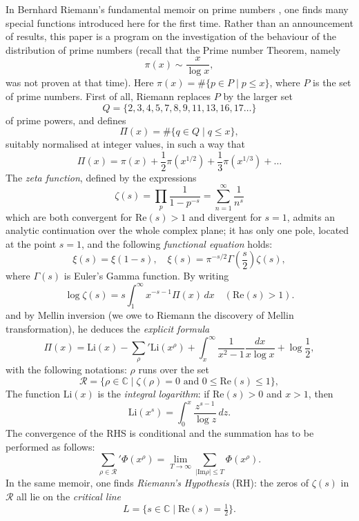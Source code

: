 \documentclass[12pt]{article}
\begin{document}
In Bernhard Riemann's fundamental memoir on prime numbers \cite{R1}, one finds many special functions introduced here for the first time. Rather than an announcement of results, this paper is a program on the investigation of the behaviour of the distribution of prime numbers (recall that the Prime number Theorem, namely
\[
\pi(x) \sim \frac{x}{\log x},
\]
was not proven at that time). Here $\pi(x) = \# \{p \in P \mid p \leq x\}$, where $P$ is the set of prime numbers. First of all, Riemann replaces $P$ by the larger set
\[
Q = \{2, 3, 4, 5, 7, 8, 9, 11, 13, 16, 17 \dots \}
\]
of prime powers, and defines
\[
\Pi(x) = \# \{q \in Q \mid q \leq x\},
\]
suitably normalised at integer values, in such a way that
\[
\Pi(x) = \pi(x) + \frac{1}{2}\pi(x^{1/2}) + \frac{1}{3}\pi(x^{1/3}) + \dots
\]
The \emph{zeta function}, defined by the expressions
\[
\zeta(s) = \prod_p \frac{1}{1 - p^{-s}} = \sum_{n=1}^{\infty} \frac{1}{n^s}
\]
which are both convergent for $\mathrm{Re}(s) > 1$ and divergent for $s = 1$, admits an analytic continuation over the whole complex plane; it has only one pole, located at the point $s = 1$, and the following \emph{functional equation} holds:
\[
\xi(s) = \xi(1-s), \quad \xi(s) = \pi^{-s/2} \Gamma\left(\frac{s}{2}\right) \zeta(s),
\]
where $\Gamma(s)$ is Euler's Gamma function. By writing
\[
\log \zeta(s) = s \int_1^{\infty} x^{-s-1} \Pi(x)\,dx \quad (\mathrm{Re}(s) > 1).
\]
and by Mellin inversion (we owe to Riemann the discovery of Mellin transformation), he deduces the \emph{explicit formula}
\begin{equation}
\Pi(x) = \mathrm{Li}(x) - \sum_{\rho}' \mathrm{Li}(x^\rho) + \int_x^{\infty} \frac{1}{x^2 - 1} \frac{dx}{x \log x} + \log \frac{1}{2},
\tag{1}
\end{equation}
with the following notations: $\rho$ runs over the set
\[
\mathcal{R} = \{\rho \in \mathbb{C} \mid \zeta(\rho) = 0 \text{ and } 0 \leq \mathrm{Re}(s) \leq 1\},
\]
The function $\mathrm{Li}(x)$ is the \emph{integral logarithm}: if $\mathrm{Re}(s) > 0$ and $x > 1$, then
\[
\mathrm{Li}(x^s) = \int_0^x \frac{z^{s-1}}{\log z}\,dz.
\]
The convergence of the RHS is conditional and the summation has to be performed as follows:
\[
\sum_{\rho \in \mathcal{R}}' \Phi(x^\rho) = \lim_{T \to \infty} \sum_{|\mathrm{Im} \rho| \leq T} \Phi(x^\rho).
\]
In the same memoir, one finds \emph{Riemann's Hypothesis} (RH): the zeros of $\zeta(s)$ in $\mathcal{R}$ all lie on the \emph{critical line}
\[
L = \{s \in \mathbb{C} \mid \mathrm{Re}(s) = \tfrac{1}{2}\}.
\]
\end{document}
